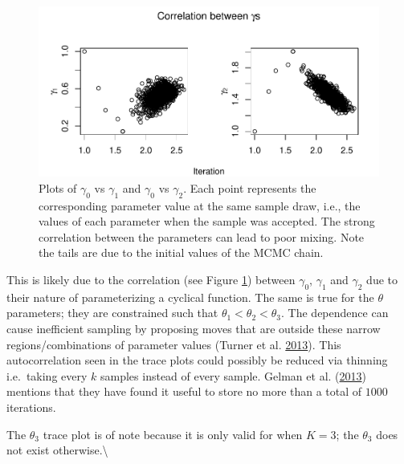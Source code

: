 \documentclass[11pt,a4paper]{article}
\numberwithin{equation}{section}
\begin{document}
\begin{figure}
\centering
\includegraphics{thesis_draft_files/figure-latex/unnamed-chunk-3-1.pdf}
\caption{\label{fig:cor_gammas}Plots of \(\gamma_0\) vs \(\gamma_1\) and
\(\gamma_0\) vs \(\gamma_2\). Each point represents the corresponding
parameter value at the same sample draw, i.e., the values of each
parameter when the sample was accepted. The strong correlation between
the parameters can lead to poor mixing. Note the tails are due to the
initial values of the MCMC chain.}
\end{figure}

This is likely due to the correlation (see Figure \ref{fig:cor_gammas})
between \(\gamma_0\), \(\gamma_1\) and \(\gamma_2\) due to their nature
of parameterizing a cyclical function. The same is true for the
\(\theta\) parameters; they are constrained such that
\(\theta_1 < \theta_2 < \theta_3\). The dependence can cause inefficient
sampling by proposing moves that are outside these narrow
regions/combinations of parameter values (Turner et al.
\protect\hyperlink{ref-turner_method_2013}{2013}). This autocorrelation
seen in the trace plots could possibly be reduced via thinning
i.e.~taking every \(k\) samples instead of every sample. Gelman et al.
(\protect\hyperlink{ref-gelman_bayesian_2013}{2013}) mentions that they
have found it useful to store no more than a total of \(1000\)
iterations.

The \(\theta_3\) trace plot is of note because it is only valid for when
\(K = 3\); the \(\theta_3\) does not exist otherwise.\textbackslash{}
\end{document}

